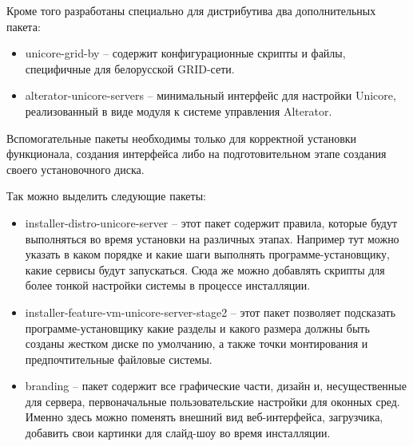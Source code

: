 \documentclass[10pt, a5paper]{article}
\begin{document}
Кроме того разработаны специально для дистрибутива два дополнительных пакета:

\begin{itemize}
	\item unicore-grid-by -- содержит конфигурационные скрипты и файлы, специфичные для белорусской GRID-сети.
	\item alterator-unicore-servers -- минимальный интерфейс для настройки Unicore, реализованный в виде модуля к системе управления Alterator.
\end{itemize}

Вспомогательные пакеты необходимы только для корректной установки функционала, создания интерфейса либо на подготовительном этапе создания своего установочного диска.

Так можно выделить следующие пакеты:
\begin{itemize}
	\item installer-distro-unicore-server -- этот пакет содержит правила, 
		которые будут выполняться во время установки на различных этапах. 
		Например тут можно указать в каком порядке и какие шаги выполнять 
		программе-установщику, какие сервисы будут запускаться. Сюда же можно 
		добавлять скрипты для более тонкой настройки системы в процессе инсталляции.
	\item installer-feature-vm-unicore-server-stage2 -- этот пакет позволяет 
		подсказать программе-установщику какие разделы и какого размера должны 
		быть созданы жестком диске по умолчанию, а также точки монтирования 
		и предпочтительные файловые системы.
	\item branding -- пакет содержит все графические части, дизайн и, 
		несущественные для сервера, первоначальные пользовательские настройки 
		для оконных сред. Именно здесь можно поменять внешний вид веб-интерфейса, 
		загрузчика, добавить свои картинки для слайд-шоу во время инсталляции.
\end{itemize}
\end{document}

